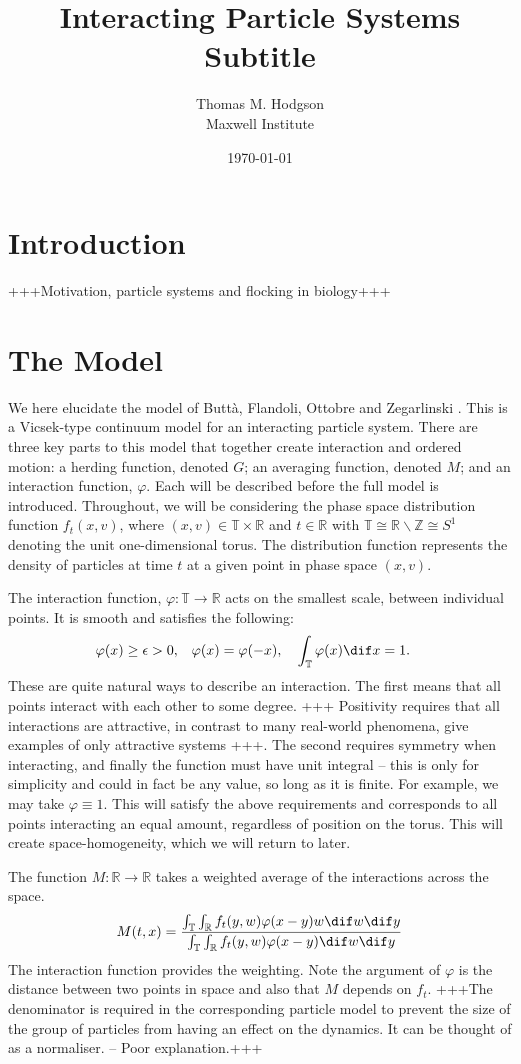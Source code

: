 \documentclass[11pt, a4paper, draft]{article}
\title{{\huge Interacting Particle Systems} \\\vspace{1cm} Subtitle}
\author{Thomas M. Hodgson\\ \vspace{0.5cm} Maxwell Institute}
\date{\today}
\renewcommand{\phi}{\varphi}
\renewcommand{\R}{\mathbb{R}}
\newcommand{\T}{\mathbb{T}}
\newcommand{\Z}{\mathbb{Z}}
\begin{document}
	\maketitle
	\newpage
	\tableofcontents
	\listoffigures
	\newpage
	\section{Introduction}
	+++Motivation, particle systems and flocking in biology+++
	\section{The Model}\label{sec:model}
		We here elucidate the model of Butt\`a, Flandoli, Ottobre and Zegarlinski \cite{Butta2019}. This is a Vicsek-type continuum model for an interacting particle system. There are three key parts to this model that together create interaction and ordered motion: a herding function, denoted $G$; an averaging function, denoted $M$; and an interaction function, $\phi$. Each will be described before the full model is introduced. Throughout, we will be considering the phase space distribution function $f_t(x,v)$, where $(x,v) \in \T \times \R$ and $t \in \R$ with $\T \cong \R \backslash \Z \cong S^1$ denoting the unit one-dimensional torus. The distribution function represents the density of particles at time $t$ at a given point in phase space $(x,v)$.
		
		The interaction function, $\phi: \T \to \R $ acts on the smallest scale, between individual points. It is smooth and satisfies the following:
		\begin{align*}
			\phi(x) \geq \epsilon >0, && \phi(x) = \phi(-x), &&& \int_{\T} \phi(x) \dif x = 1.
		\end{align*}
		These are quite natural ways to describe an interaction. The first means that all points interact with each other to some degree. +++ Positivity requires that all interactions are attractive, in contrast to many real-world phenomena, give examples of only attractive systems +++. The second requires symmetry when interacting, and finally the function must have unit integral -- this is only for simplicity and could in fact be any value, so long as it is finite. For example, we may take $\phi \equiv 1$. This will satisfy the above requirements and corresponds to all points interacting an equal amount, regardless of position on the torus. This will create space-homogeneity, which we will return to later.
		
		The function $M:\R \to \R$ takes a weighted average of the interactions across the space.	
		\[ 
			M(t,x) = \frac{\int_{\T}\int_{\R}f_t(y,w)\phi(x-y)w\dif w \dif y}{\int_{\T}\int_{\R}f_t(y,w)\phi(x-y)\dif w \dif y}
		\]
		The interaction function provides the weighting. Note the argument of  $\phi$ is the distance between two points in space and also that $M$ depends on $f_t$. +++The denominator is required in the corresponding particle model to prevent the size of the group of particles from having an effect on the dynamics. It can be thought of as a normaliser. -- Poor explanation.+++
		
\end{document}
